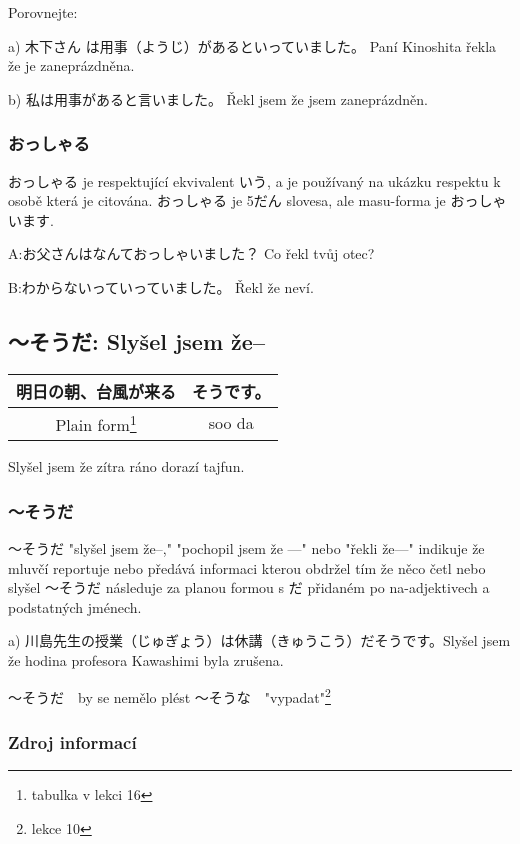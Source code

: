Porovnejte:

a) 木下さん は用事（ようじ）があるといっていました。 Paní Kinoshita řekla že je zaneprázdněna.


b)  私は用事があると言いました。 Řekl jsem že jsem zaneprázdněn.


\subsubsection{おっしゃる}
おっしゃる je respektující ekvivalent  いう, a je používaný na ukázku respektu k osobě která je citována. おっしゃる je 5だん slovesa, ale masu-forma je おっしゃいます.

A:お父さんはなんておっしゃいました？ Co řekl tvůj otec?

B:わからないっていっていました。 Řekl že neví.


\subsection{〜そうだ: Slyšel jsem že--}


\begin{center}
\begin{tabular}{|| c | c ||}
明日の朝、台風が来る & そうです。\\
\hline
Plain form\footnote{tabulka v lekci 16} & soo da \\
\hline
\end{tabular}
\end{center}
Slyšel jsem že zítra ráno dorazí tajfun.


\subsubsection{〜そうだ}

〜そうだ "slyšel jsem že--," "pochopil jsem že ---" nebo "řekli že---" indikuje že mluvčí reportuje nebo předává informaci kterou obdržel tím že něco četl nebo slyšel 〜そうだ následuje za planou formou s だ přidaném po na-adjektivech a podstatných jménech.

a) 川島先生の授業（じゅぎょう）は休講（きゅうこう）だそうです。Slyšel jsem že hodina profesora Kawashimi byla zrušena.

〜そうだ　by se nemělo plést 〜そうな　"vypadat"\footnote{lekce 10}

\subsubsection{Zdroj informací}

